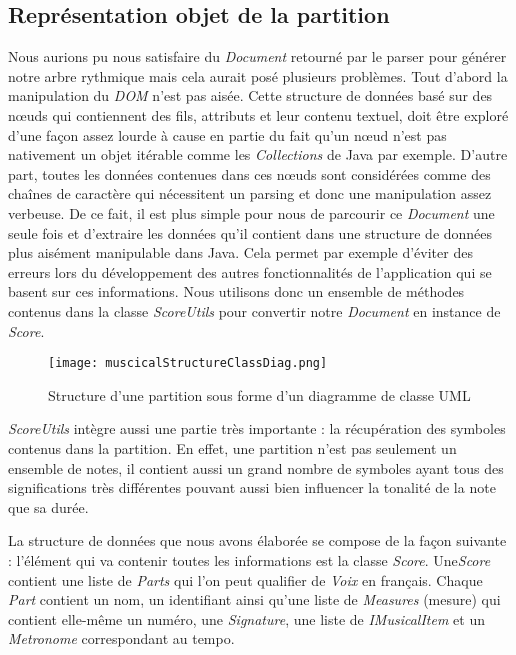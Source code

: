 \subsection{Représentation objet de la partition}

\par
Nous aurions pu nous satisfaire du \emph{Document} retourné par le parser pour générer notre arbre rythmique mais cela aurait posé plusieurs problèmes. Tout d'abord la manipulation du \emph{DOM} n'est pas aisée. Cette structure de données basé sur des nœuds qui contiennent des fils, attributs et leur contenu textuel, doit être exploré d'une façon assez lourde à cause en partie du fait qu'un nœud n'est pas nativement un objet itérable comme les \emph{Collections} de Java par exemple. D'autre part, toutes les données contenues dans ces nœuds sont considérées comme des chaînes de caractère qui nécessitent un parsing et donc une manipulation assez verbeuse. De ce fait, il est plus simple pour nous de parcourir ce \emph{Document} une seule fois et d'extraire les données qu'il contient dans une structure de données plus aisément manipulable dans Java. Cela permet par exemple d'éviter des erreurs lors du développement des autres fonctionnalités de l'application qui se basent sur ces informations. Nous utilisons donc un ensemble de méthodes contenus dans la classe \emph{ScoreUtils} pour convertir notre \emph{Document} en instance de \emph{Score}.

\begin{figure}[!h]
\centering
\texttt{[image: muscicalStructureClassDiag.png]}\\[1cm]
\caption{Structure d'une partition sous forme d'un diagramme de classe UML}
\end{figure}

\par
\emph{ScoreUtils} intègre aussi une partie très importante : la récupération des symboles contenus dans la partition. En effet, une partition n'est pas seulement un ensemble de notes, il contient aussi un grand nombre de symboles ayant tous des significations très différentes pouvant aussi bien influencer la tonalité de la note que sa durée.


\par
La structure de données que nous avons élaborée se compose de la façon suivante : l'élément qui va contenir toutes les informations est la classe \emph{Score}. Une\emph{Score} contient une liste de \emph{Parts} qui l'on peut qualifier de \emph{Voix} en français. Chaque \emph{Part} contient un nom, un identifiant ainsi qu'une liste de \emph{Measures} (mesure) qui contient elle-même un numéro, une \emph{Signature}, une liste de \emph{IMusicalItem} et un \emph{Metronome} correspondant au tempo.

